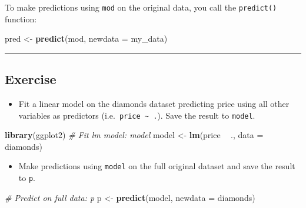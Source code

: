 \documentclass[
]{book}
\newenvironment{Shaded}{\begin{snugshade}}{\end{snugshade}}
\newcommand{\CommentTok}[1]{\textcolor[rgb]{0.56,0.35,0.01}{\textit{#1}}}
\newcommand{\DataTypeTok}[1]{\textcolor[rgb]{0.13,0.29,0.53}{#1}}
\newcommand{\KeywordTok}[1]{\textcolor[rgb]{0.13,0.29,0.53}{\textbf{#1}}}
\newcommand{\NormalTok}[1]{#1}
\newcommand{\OperatorTok}[1]{\textcolor[rgb]{0.81,0.36,0.00}{\textbf{#1}}}
\newcommand{\StringTok}[1]{\textcolor[rgb]{0.31,0.60,0.02}{#1}}
\providecommand{\tightlist}{%
  \setlength{\itemsep}{0pt}\setlength{\parskip}{0pt}}
\begin{document}
To make predictions using \texttt{mod} on the original data, you call the \texttt{predict()} function:

\begin{Shaded}
\begin{Highlighting}[]
\NormalTok{pred <-}\StringTok{ }\KeywordTok{predict}\NormalTok{(mod, }\DataTypeTok{newdata =}\NormalTok{ my_data)}
\end{Highlighting}
\end{Shaded}

\begin{center}\rule{0.5\linewidth}{0.5pt}\end{center}

\hypertarget{exercise}{%
\subsection*{Exercise}\label{exercise}}

\begin{itemize}
\tightlist
\item
  Fit a linear model on the diamonds dataset predicting price using all other variables as predictors (i.e.~\texttt{price\ \textasciitilde{}\ .}). Save the result to \texttt{model}.
\end{itemize}

\begin{Shaded}
\begin{Highlighting}[]
\KeywordTok{library}\NormalTok{(ggplot2)}
\CommentTok{# Fit lm model: model}
\NormalTok{model <-}\StringTok{ }\KeywordTok{lm}\NormalTok{(price }\OperatorTok{~}\StringTok{ }\NormalTok{., }\DataTypeTok{data =}\NormalTok{ diamonds)}
\end{Highlighting}
\end{Shaded}

\begin{itemize}
\tightlist
\item
  Make predictions using \texttt{model} on the full original dataset and save the result to \texttt{p}.
\end{itemize}

\begin{Shaded}
\begin{Highlighting}[]
\CommentTok{# Predict on full data: p}
\NormalTok{p <-}\StringTok{ }\KeywordTok{predict}\NormalTok{(model, }\DataTypeTok{newdata =}\NormalTok{ diamonds)}
\end{Highlighting}
\end{Shaded}
\end{document}
